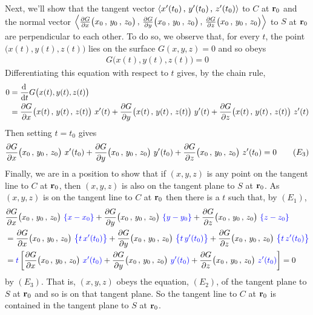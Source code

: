 \begin{solution}
\begin{itemize}
\end{itemize}
Next, we'll show that the tangent vector  
$\left< x'(t_0)\,,\,y'(t_0)\,,\,z'(t_0) \right>$ to $C$ at $\mathbf{r}_0$ and the normal vector $\llt\pdiff{G}{x}\big( x_0\,,\,y_0\,,\,z_0\big)\,,\,
\pdiff{G}{y}\big( x_0\,,\,y_0\,,\,z_0\big)\,,\,
\pdiff{G}{z}\big( x_0\,,\,y_0\,,\,z_0\big)\rgt$ to $S$ at $\mathbf{r}_0$ are 
perpendicular to each other. To do so, we observe that,
for every $t$, the point $\big(x(t),y(t),z(t)\big)$
lies on the surface $G(x,y,z)=0$ and so obeys
\begin{align*}
G\big(x(t),y(t),z(t)\big) =0
\end{align*}
Differentiating this equation with respect to $t$ gives,
by the chain rule,
\begin{align*}
0&= \diff{}{t}G\big(x(t),y(t),z(t)\big) \\
&=\pdiff{G}{x}\big( x(t)\,,\,y(t)\,,\,z(t)\big)\ x'(t)
+\pdiff{G}{y}\big( x(t)\,,\,y(t)\,,\,z(t)\big)\ y'(t)
+\pdiff{G}{z}\big( x(t)\,,\,y(t)\,,\,z(t)\big)\ z'(t)
\end{align*}
Then setting $t=t_0$ gives 
\begin{equation*}
\pdiff{G}{x}\big( x_0\,,\,y_0\,,\,z_0\big)\ x'(t_0)
+\pdiff{G}{y}\big( x_0\,,\,y_0\,,\,z_0\big)\ y'(t_0)
+\pdiff{G}{z}\big( x_0\,,\,y_0\,,\,z_0\big)\ z'(t_0) = 0
\tag{$E_3$}
\end{equation*}
Finally, we are in a position to show that if $(x,y,z)$ is any point on 
the tangent line to $C$ at $\mathbf{r}_0$, then $(x,y,z)$ is also on the 
tangent plane to $S$ at $\mathbf{r}_0$. As $(x,y,z)$ is on the tangent line to $C$ 
at $\mathbf{r}_0$ then there is a $t$ such that, by $(E_1)$,
\begin{align*}
&\pdiff{G}{x}\big( x_0\,,\,y_0\,,\,z_0\big)\ \textcolor{blue}{\{x-x_0\}}
+\pdiff{G}{y}\big( x_0\,,\,y_0\,,\,z_0\big)\ \textcolor{blue}{\{y-y_0\}}
+\pdiff{G}{z}\big( x_0\,,\,y_0\,,\,z_0\big)\ \textcolor{blue}{\{z-z_0\}}
\\
&=\pdiff{G}{x}\big( x_0\,,\,y_0\,,\,z_0\big)\ 
               \textcolor{blue}{\big\{ t\,x'(t_0)\big\}}
+\pdiff{G}{y}\big( x_0\,,\,y_0\,,\,z_0\big)\ 
               \textcolor{blue}{\big\{ t\,y'(t_0)\big\}}
+\pdiff{G}{z}\big( x_0\,,\,y_0\,,\,z_0\big)\ 
               \textcolor{blue}{\big\{ t\,z'(t_0)\big\}}\\
&=\textcolor{blue}{t}\left[\pdiff{G}{x}\big( x_0\,,\,y_0\,,\,z_0\big)\ 
                \textcolor{blue}{x'(t_0)}
+\pdiff{G}{y}\big( x_0\,,\,y_0\,,\,z_0\big)\ 
                \textcolor{blue}{y'(t_0)}
+\pdiff{G}{z}\big( x_0\,,\,y_0\,,\,z_0\big)\ 
                 \textcolor{blue}{z'(t_0)} \right]
=0
\end{align*}
by $(E_3)$. That is, $(x,y,z)$ obeys the equation, $(E_2)$, of the tangent plane to $S$ at $\mathbf{r}_0$ and so is on that tangent plane.  So the tangent 
line to $C$ at $\mathbf{r}_0$ is contained in the tangent plane to $S$ at $\mathbf{r}_0$.

\end{solution}

